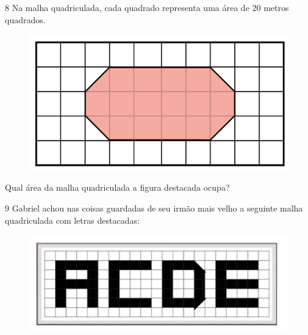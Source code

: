 
\num{8} Na malha quadriculada, cada quadrado representa uma área de
20 metros quadrados.

\begin{figure}[htpb!]
\centering
\includegraphics[width=.8\textwidth]{../ilustracoes/MAT5/SAEB_5ANO_MAT_figura43.png}
\end{figure}

Qual área da malha quadriculada a figura destacada ocupa?

\begin{emptybox}
\end{emptybox}

\pagebreak
\num{9} Gabriel achou nas coisas guardadas de seu irmão mais velho a
seguinte malha quadriculada com letras destacadas:

\begin{figure}[htpb!]
\centering
\includegraphics[width=\textwidth]{./imgs/mat7.png}
\end{figure}

